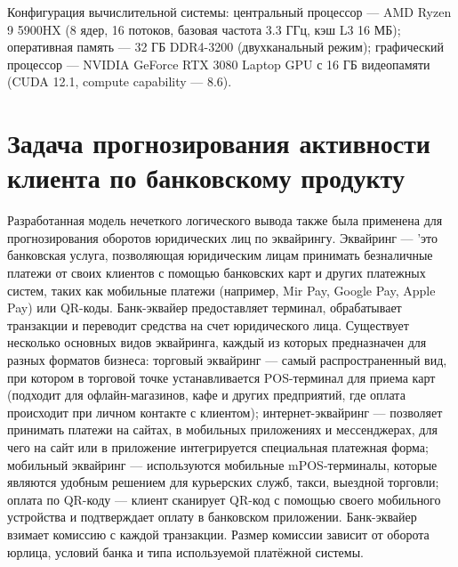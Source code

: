 Конфигурация вычислительной системы: центральный процессор --- AMD Ryzen 9 5900HX (8 ядер, 16 потоков, базовая частота 3.3 ГГц, кэш L3 16 МБ); оперативная память --- 32 ГБ DDR4-3200 (двухканальный режим); графический процессор --- NVIDIA GeForce RTX 3080 Laptop GPU с 16 ГБ видеопамяти (CUDA 12.1, compute capability --- 8.6).


\section{Задача прогнозирования активности клиента по банковскому продукту}

Разработанная модель нечеткого логического вывода также была применена для прогнозирования оборотов юридических лиц по эквайрингу. Эквайринг --- 'это банковская услуга, позволяющая юридическим лицам принимать безналичные платежи от своих клиентов с помощью банковских карт и других платежных систем, таких как мобильные платежи (например, Mir Pay, Google Pay, Apple Pay) или QR-коды. Банк-эквайер предоставляет терминал, обрабатывает транзакции и переводит средства на счет юридического лица. Существует несколько основных видов эквайринга, каждый из которых предназначен для разных форматов бизнеса: торговый эквайринг --- самый распространенный вид, при котором в торговой точке устанавливается POS-терминал для приема карт (подходит для офлайн-магазинов, кафе и других предприятий, где оплата происходит при личном контакте с клиентом); интернет-эквайринг --- позволяет принимать платежи на сайтах, в мобильных приложениях и мессенджерах, для чего на сайт или в приложение интегрируется специальная платежная форма; мобильный эквайринг --- используются мобильные mPOS-терминалы, которые являются удобным решением для курьерских служб, такси, выездной торговли; оплата по QR-коду --- клиент сканирует QR-код с помощью своего мобильного устройства и подтверждает оплату в банковском приложении. Банк-эквайер взимает комиссию с каждой транзакции. Размер комиссии зависит от оборота юрлица, условий банка и типа используемой платёжной системы.

